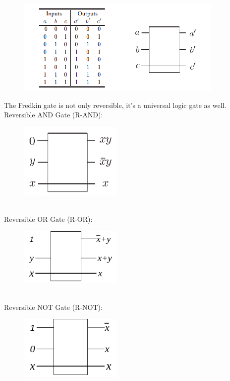 \documentclass{article}
\begin{document}
\begin{figure}[htp]
	\centering
	\includegraphics[width=10cm]{fredkin.png}
\end{figure}

The Fredkin gate is not only reversible, it’s a universal logic gate
as well.\\

Reversible AND Gate (R-AND):
\begin{figure}[htp]
	\includegraphics[width=5cm]{rand.png}
\end{figure}
\\

Reversible OR Gate (R-OR):
\begin{figure}[htp]
	\includegraphics[width=5cm]{ror.png}
\end{figure}
\\

Reversible NOT Gate (R-NOT):
\begin{figure}[htp]
	\includegraphics[width=5cm]{rnot.png}
\end{figure}
\end{document}
